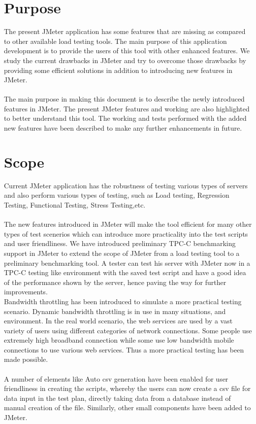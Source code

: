 \documentclass[12pt]{book}
\begin{document}
\section{Purpose}
The present JMeter application has some features that are missing as compared to other available
load testing tools. The main purpose of this application development is to provide the users of
this tool with other enhanced features. We study the current drawbacks in JMeter and try to
overcome those drawbacks by providing some efficient solutions in addition to introducing new
features in JMeter.\\
\\
The main purpose in making this document is to describe the newly introduced features in
JMeter. The present JMeter features and working are also highlighted to better understand this
tool. The working and tests performed with the added new features have been described to make
any further enhancements in future.

\section{Scope}
Current JMeter application has the robustness of testing various types of servers and also perform
various types of testing, such as Load testing, Regression Testing, Functional Testing, Stress
Testing,etc.\\
\\
The new features introduced in JMeter will make the tool efficient for many other types of test
scenerios which can introduce more practicality into the test scripts and user friendliness. We
have introduced preliminary TPC-C benchmarking support in JMeter to extend the scope of
JMeter from a load testing tool to a preliminary benchmarking tool. A tester can test his server
with JMeter now in a TPC-C testing like environment with the saved test script and have a good
idea of the performance shown by the server, hence paving the way for further improvements.\\
Bandwidth throttling has been introduced to simulate a more practical testing scenario. Dynamic
bandwidth throttling is in use in many situations, and environment. In the real world scenario, the
web services are used by a vast variety of users using different categories of network
connections. Some people use extremely high broadband connection while some use low
bandwidth mobile connections to use various web services. Thus a more practical testing has
been made possible. \\
\\
A number of elements like Auto csv generation have been enabled for user friendliness in
creating the scripts, whereby the users can now create a csv file for data input in the test plan,
directly taking data from a database instead of manual creation of the file. 
Similarly, other small components have been added to JMeter.
\end{document}

